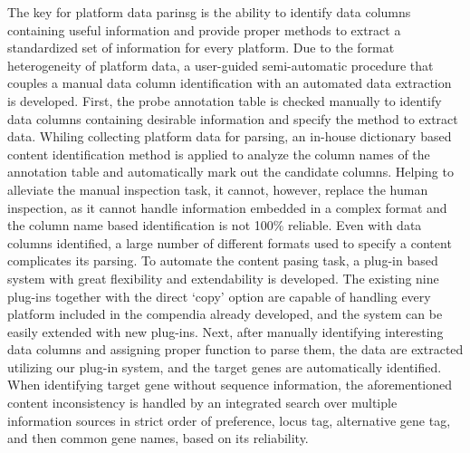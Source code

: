 The key for platform data parinsg is the ability to identify data columns
containing useful information and provide proper methods to extract a
standardized set of information for every platform.
%
Due to the format heterogeneity of platform data, a user-guided semi-automatic
procedure that couples a manual data column identification with an automated
data extraction is developed.
%
First, the probe annotation table is checked manually to identify data columns
containing desirable information and specify the method to extract data.
%
Whiling collecting platform data for parsing, an in-house dictionary based
content identification method is applied to analyze the column names of the
annotation table and automatically mark out the candidate columns.
%
Helping to alleviate the manual inspection task, it cannot, however, replace
the human inspection, as it cannot handle information embedded in a complex
format and the column name based identification is not 100\% reliable.
%
Even with data columns identified, a large number of different formats used to
specify a content complicates its parsing.
To automate the content pasing task, a plug-in based system with great
flexibility and extendability is developed.
%
The existing nine plug-ins together with the direct `copy' option are capable
of handling every platform included in the compendia already developed, and
the system can be easily extended with new plug-ins.
%
Next, after manually identifying interesting data columns and assigning proper
function to parse them, the data are extracted utilizing our plug-in system,
and the target genes are automatically identified.
%
When identifying target gene without sequence information, the aforementioned
content inconsistency is handled by an integrated search over multiple
information sources in strict order of preference, locus tag, alternative gene
tag, and then common gene names, based on its reliability.




